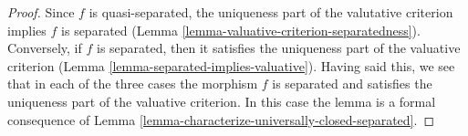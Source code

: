 \documentclass[10pt,a4paper]{amsart}
\theoremstyle{plain}
\theoremstyle{definition}
\theoremstyle{remark}
\numberwithin{equation}{subsection}
\begin{document}
\begin{proof}
Since $f$ is quasi-separated, the uniqueness
part of the valutative criterion implies $f$ is separated
(Lemma \ref{lemma-valuative-criterion-separatedness}).
Conversely, if $f$ is separated, then it satisfies the
uniqueness part of the valuative criterion
(Lemma \ref{lemma-separated-implies-valuative}).
Having said this, we see that in each of the three cases the
morphism $f$ is separated and satisfies the uniqueness part
of the valuative criterion. In this case the lemma is a formal
consequence of
Lemma \ref{lemma-characterize-universally-closed-separated}.
\end{proof}
\end{document}

